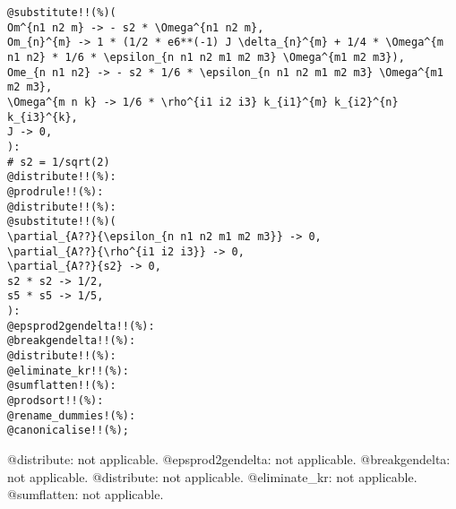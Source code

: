 \documentclass[11pt]{article}
\begin{document}
{\color[named]{Blue}\begin{verbatim}
@substitute!!(%)(
Om^{n1 n2 m} -> - s2 * \Omega^{n1 n2 m},
Om_{n}^{m} -> 1 * (1/2 * e6**(-1) J \delta_{n}^{m} + 1/4 * \Omega^{m n1 n2} * 1/6 * \epsilon_{n n1 n2 m1 m2 m3} \Omega^{m1 m2 m3}),
Ome_{n n1 n2} -> - s2 * 1/6 * \epsilon_{n n1 n2 m1 m2 m3} \Omega^{m1 m2 m3},
\Omega^{m n k} -> 1/6 * \rho^{i1 i2 i3} k_{i1}^{m} k_{i2}^{n} k_{i3}^{k},
J -> 0,
):
# s2 = 1/sqrt(2)
@distribute!!(%):
@prodrule!!(%):
@distribute!!(%):
@substitute!!(%)(
\partial_{A??}{\epsilon_{n n1 n2 m1 m2 m3}} -> 0,
\partial_{A??}{\rho^{i1 i2 i3}} -> 0,
\partial_{A??}{s2} -> 0,
s2 * s2 -> 1/2,
s5 * s5 -> 1/5,
):
@epsprod2gendelta!!(%):
@breakgendelta!!(%):
@distribute!!(%):
@eliminate_kr!!(%):
@sumflatten!!(%):
@prodsort!!(%):
@rename_dummies!(%):
@canonicalise!!(%);
\end{verbatim}}
@distribute: not applicable.
@epsprod2gendelta: not applicable.
@breakgendelta: not applicable.
@distribute: not applicable.
@eliminate\_kr: not applicable.
@sumflatten: not applicable.
\end{document}
